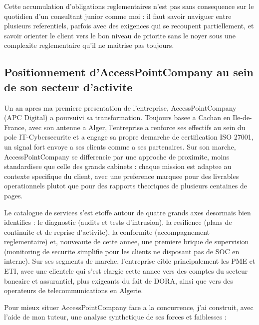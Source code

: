 \documentclass[11pt,a4paper]{article}
\begin{document}
Cette accumulation d'obligations reglementaires n'est pas sans consequence sur le quotidien d'un consultant junior comme moi : il faut savoir naviguer entre plusieurs referentiels, parfois avec des exigences qui se recoupent partiellement, et savoir orienter le client vers le bon niveau de priorite sans le noyer sous une complexite reglementaire qu'il ne maitrise pas toujours.

\subsection{Positionnement d'AccessPointCompany au sein de son secteur d'activite}

Un an apres ma premiere presentation de l'entreprise, AccessPointCompany (APC Digital) a poursuivi sa transformation. Toujours basee a Cachan en Ile-de-France, avec son antenne a Alger, l'entreprise a renforce ses effectifs au sein du pole IT-Cybersecurite et a engage sa propre demarche de certification ISO 27001, un signal fort envoye a ses clients comme a ses partenaires. Sur son marche, AccessPointCompany se differencie par une approche de proximite, moins standardisee que celle des grands cabinets : chaque mission est adaptee au contexte specifique du client, avec une preference marquee pour des livrables operationnels plutot que pour des rapports theoriques de plusieurs centaines de pages.

Le catalogue de services s'est etoffe autour de quatre grands axes desormais bien identifies : le diagnostic (audits et tests d'intrusion), la resilience (plans de continuite et de reprise d'activite), la conformite (accompagnement reglementaire) et, nouveaute de cette annee, une premiere brique de supervision (monitoring de securite simplifie pour les clients ne disposant pas de SOC en interne). Sur ses segments de marche, l'entreprise cible principalement les PME et ETI, avec une clientele qui s'est elargie cette annee vers des comptes du secteur bancaire et assurantiel, plus exigeants du fait de DORA, ainsi que vers des operateurs de telecommunications en Algerie.

Pour mieux situer AccessPointCompany face a la concurrence, j'ai construit, avec l'aide de mon tuteur, une analyse synthetique de ses forces et faiblesses :
\end{document}
